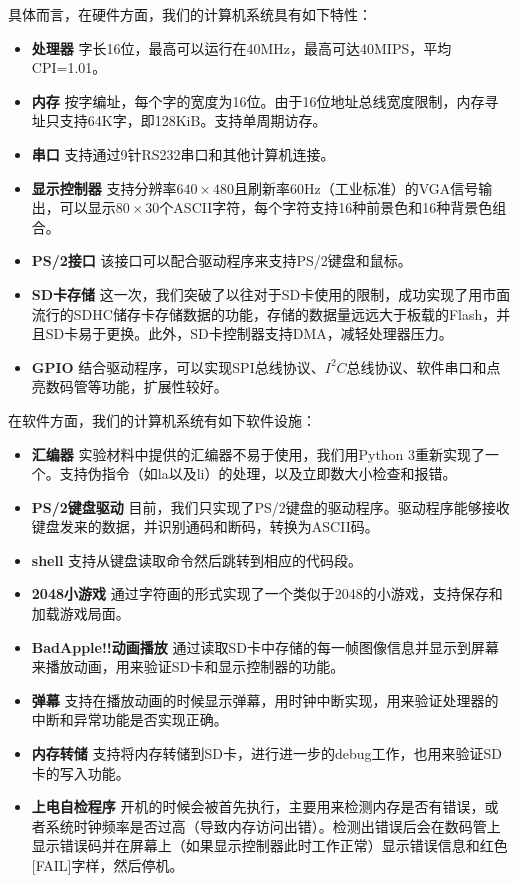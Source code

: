 \documentclass[11pt,utf8]{report}
\begin{document}
	\newpage

具体而言，在硬件方面，我们的计算机系统具有如下特性：
\begin{itemize}
\item \textbf{处理器} 字长16位，最高可以运行在40MHz，最高可达40MIPS，平均CPI=1.01。
\item \textbf{内存} 按字编址，每个字的宽度为16位。由于16位地址总线宽度限制，内存寻址只支持64K字，即128KiB。支持单周期访存。
\item \textbf{串口} 支持通过9针RS232串口和其他计算机连接。
\item \textbf{显示控制器} 支持分辨率$640 \times 480$且刷新率60Hz（工业标准）的VGA信号输出，可以显示$80 \times 30$个ASCII字符，每个字符支持16种前景色和16种背景色组合。
\item \textbf{PS/2接口} 该接口可以配合驱动程序来支持PS/2键盘和鼠标。
\item \textbf{SD卡存储} 这一次，我们突破了以往对于SD卡使用的限制，成功实现了用市面流行的SDHC储存卡存储数据的功能，存储的数据量远远大于板载的Flash，并且SD卡易于更换。此外，SD卡控制器支持DMA，减轻处理器压力。
\item \textbf{GPIO} 结合驱动程序，可以实现SPI总线协议、$I^2C$总线协议、软件串口和点亮数码管等功能，扩展性较好。
\end{itemize}

在软件方面，我们的计算机系统有如下软件设施：
\begin{itemize}
\item \textbf{汇编器} 实验材料中提供的汇编器不易于使用，我们用Python 3重新实现了一个。支持伪指令（如la以及li）的处理，以及立即数大小检查和报错。
\item \textbf{PS/2键盘驱动} 目前，我们只实现了PS/2键盘的驱动程序。驱动程序能够接收键盘发来的数据，并识别通码和断码，转换为ASCII码。
\item \textbf{shell} 支持从键盘读取命令然后跳转到相应的代码段。
\item \textbf{2048小游戏} 通过字符画的形式实现了一个类似于2048的小游戏，支持保存和加载游戏局面。
\item \textbf{BadApple!!动画播放} 通过读取SD卡中存储的每一帧图像信息并显示到屏幕来播放动画，用来验证SD卡和显示控制器的功能。
\item \textbf{弹幕} 支持在播放动画的时候显示弹幕，用时钟中断实现，用来验证处理器的中断和异常功能是否实现正确。
\item \textbf{内存转储} 支持将内存转储到SD卡，进行进一步的debug工作，也用来验证SD卡的写入功能。
\item \textbf{上电自检程序} 开机的时候会被首先执行，主要用来检测内存是否有错误，或者系统时钟频率是否过高（导致内存访问出错）。检测出错误后会在数码管上显示错误码并在屏幕上（如果显示控制器此时工作正常）显示错误信息和红色[FAIL]字样，然后停机。
\end{itemize}
\end{document}
